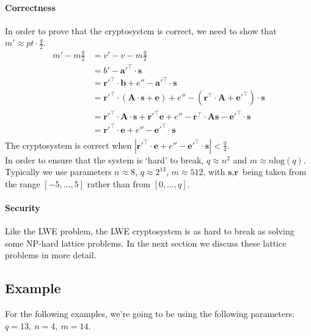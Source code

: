 \documentclass[a4paper, 11pt, openany]{book}
\begin{document}
\paragraph{Correctness} In order to prove that the cryptosystem is correct, we need to show that $m' \approx pt\cdot\frac{q}{2}$.
\begin{align*}
m'- m\frac{q}{2} & = v' - v - m\frac{q}{2} \\
& = b' - \textbf{a}'^{\top}\cdot\textbf{s} \\
& = \textbf{r}'^{\top}\cdot\textbf{b} + e'' - \textbf{a}'^{\top}\cdot\textbf{s} \\
& = \textbf{r}'^{\top}\cdot(\textbf{A}\cdot \textbf{s}+\textbf{e}) + e'' - (\textbf{r}^{\top}\cdot\textbf{A} + \textbf{e}'^{\top})\cdot\textbf{s} \\
& = \textbf{r}'^{\top}\cdot\textbf{A}\cdot \textbf{s}+\textbf{r}'^{\top}\textbf{e}+ e'' -\textbf{r}^{\top}\cdot\textbf{A}\textbf{s} - \textbf{e}'^{\top}\cdot\textbf{s} \\
& = \textbf{r}'^{\top}\cdot\textbf{e} + e'' - \textbf{e}'^{\top}\cdot\textbf{s} \\
\end{align*}
The cryptosystem is correct when $|\textbf{r}'^{\top}\cdot\textbf{e} + e'' - \textbf{e}'^{\top}\cdot\textbf{s}| < \frac{q}{4}$.
\\
In order to ensure that the system is `hard' to break, $q \approx n^2$ and $m \approx n\text{log}(q)$. Typically we use parameters $n \approx 8$, $q\approx 2^{13}$, $m\approx 512$, with $\textbf{s}, \textbf{r}$ being taken from the range $[-5, \ldots ,5]$ rather than from $[0, \ldots ,q]$.
\paragraph{Security} Like the LWE problem, the LWE cryptosystem is as hard to break as solving some NP-hard lattice problems. In the next section we discuss these lattice problems in more detail.
\subsection{Example}
For the following examples, we're going to be using the following parameters: $q = 13,~ n=4,~ m=14$.
\end{document}
